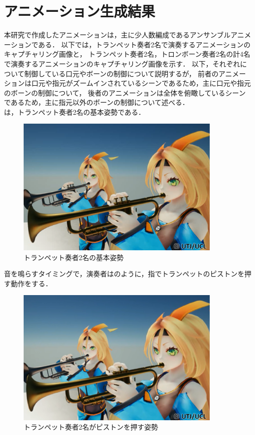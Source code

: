 \section{アニメーション生成結果} \label{sec:result}
本研究で作成したアニメーションは，主に少人数編成であるアンサンブルアニメーションである．
以下では，トランペット奏者2名で演奏するアニメーションのキャプチャリング画像と，
トランペット奏者2名，トロンボーン奏者2名の計4名で演奏するアニメーションのキャプチャリング画像を示す．
以下，それぞれについて制御している口元やボーンの制御について説明するが，
前者のアニメーションは口元や指元がズームインされているシーンであるため，主に口元や指元のボーンの制御について，
後者のアニメーションは全体を俯瞰しているシーンであるため，主に指元以外のボーンの制御について述べる．\\
\indent
{}は，トランペット奏者2名の基本姿勢である．
\begin{figure}[h]
	\centering
	\includegraphics[width=10cm]{fig/chap4/anim1.eps}
	\caption{トランペット奏者2名の基本姿勢}
	\label{fig:anim1}
\end{figure}
音を鳴らすタイミングで，演奏者はのように，指でトランペットのピストンを押す動作をする．
\begin{figure}[h]
	\centering
	\includegraphics[width=10cm]{fig/chap4/anim1_finger.eps}
	\caption{トランペット奏者2名がピストンを押す姿勢}
	\label{fig:anim1_finger}
\end{figure}


